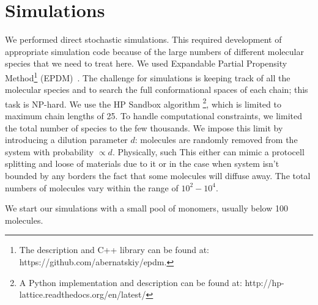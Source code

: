 \documentclass[5p,times]{elsarticle}
\begin{document}
 \section{Simulations}
We performed direct stochastic simulations.  This required development of appropriate simulation 
code because of the large numbers of different molecular species that we need to treat here.  We 
used Expandable Partial Propensity Method\footnote{The description and 
C++ library can be found at: https://github.com/abernatskiy/epdm.} (EPDM)~\cite{Guseva2016b}. The 
challenge for simulations is 
keeping track of all the molecular species and to search the full conformational spaces of each 
chain; this task is NP-hard.  We use the HP Sandbox 
algorithm\cite{lau1989lattice,Dill2008} \footnote{A Python implementation and description can be 
found at: http://hp-lattice.readthedocs.org/en/latest/}, which is 
limited to maximum chain lengths 
of 25.  To handle computational constraints, we 
limited the total number of species to the few 
thousands.  We impose this limit by introducing a dilution parameter $d$: molecules are randomly 
removed from the system with probability $\propto d$.  Physically, such This either can mimic a 
protocell splitting and loose of materials due to it or in the case when system isn't bounded by 
any 
borders the fact that some molecules will diffuse away. The total numbers of molecules vary within 
the range of $10^2-10^4$.

We start our simulations with a small pool of monomers, usually below 100 molecules. 
\end{document}
